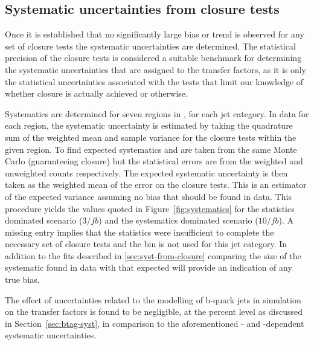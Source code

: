 \subsection{Systematic uncertainties from closure tests\label{sec:syst-from-closure}}

Once it is established that no significantly large bias or trend is
observed for any set of closure tests the systematic uncertainties
are determined. The statistical precision of the closure tests is
considered a suitable benchmark for determining the systematic
uncertainties that are assigned to the transfer factors, as it is only
the statistical uncertainties associated with the tests that limit our
knowledge of whether closure is actually achieved or otherwise.

Systematics are determined for seven regions in \scalht,
for each jet category. In data for each \scalht region, the systematic uncertainty 
is estimated by taking the quadrature sum of the weighted mean and sample variance for 
the closure tests within the given \scalht region. To find expected systematics \nobs and \npre are 
taken from the same Monte Carlo (guaranteeing closure) but the statistical errors are 
from the weighted and unweighted counts respectively. The expected systematic uncertainty is then 
taken as the weighted mean of the error on the closure tests. This is an estimator of the expected variance
assuming no bias that should be found in data. 
This procedure yields the values quoted in Figure~\ref{fig:systematics} for the statistics
dominated scenario ($3/fb$) and the systematics dominated scenario ($10/fb$). 
A missing entry implies that the statistics were insufficient to complete the 
necessary set of closure tests and the \scalht bin is not used for this jet category. 
In addition to the fits described in \ref{sec:syst-from-closure} comparing the 
size of the systematic found in data with that expected will provide 
an indication of any true bias.

The effect of uncertainties related to the modelling of b-quark jets
in simulation on the transfer factors is found to be negligible, at
the percent level as discussed in Section~\ref{sec:btag-syst}, in
comparison to the aforementioned \njet- and \scalht-dependent
systematic uncertainties.

